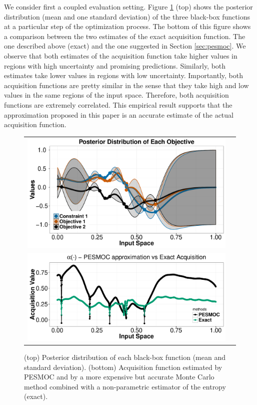 \documentclass[review,preprint,12pt]{elsarticle}
\begin{document}
We consider first a coupled evaluation setting. Figure \ref{fig:exact_coupled} (top) shows the posterior distribution 
(mean and one standard deviation) of the three black-box functions at a particular step of the optimization process. 
The bottom of this figure shows a comparison between the two estimates of the exact acquisition function. 
The one described above (exact) and the one suggested in Section \ref{sec:pesmoc}. 
We observe that both estimates of the acquisition function take higher values in regions with high 
uncertainty and promising predictions. Similarly, both estimates take lower values in regions with low uncertainty.
Importantly, both acquisition functions are pretty similar in the sense that they take high and low values in the 
same regions of the input space. Therefore, both acquisition functions are extremely correlated. This 
empirical result supports that the approximation proposed in this paper is an accurate estimate of the 
actual acquisition function.

\begin{figure}[htb]
\begin{center}
\begin{tabular}{cc}
        \includegraphics[width=0.7\linewidth]{figures/acquisition/plot_posterior_coupled.pdf} \\
        \includegraphics[width=0.7\linewidth]{figures/acquisition/plot_acq_coupled.pdf}
\end{tabular}
\caption{(top) Posterior distribution of each black-box function 
	(mean and standard deviation). (bottom) Acquisition function estimated by PESMOC and by a more expensive 
	but accurate Monte Carlo method combined with a non-parametric estimator of the entropy (exact). 
	}
        \label{fig:exact_coupled}
\end{center}
\end{figure}
\end{document}
